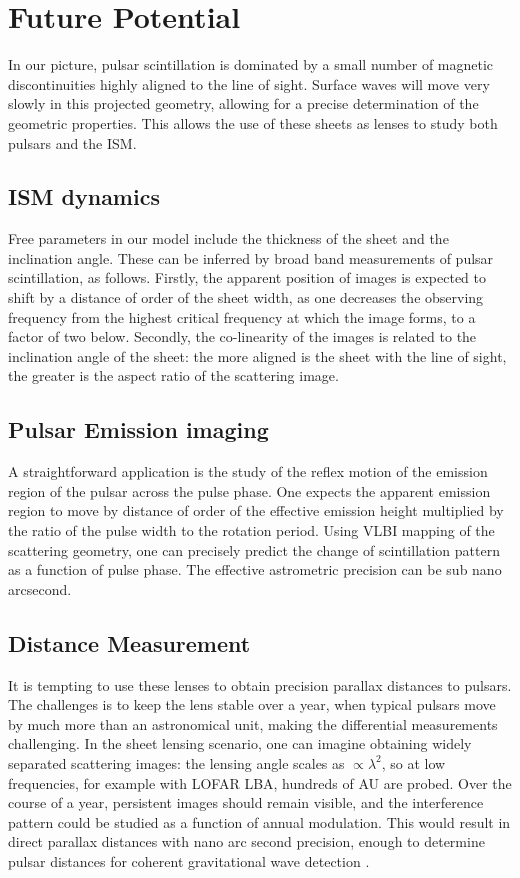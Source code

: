 \documentclass[useAMS,usenatbib]{mn2e}
\begin{document}
\section{Future Potential}

In our picture, pulsar scintillation is dominated by a small number of
magnetic discontinuities highly aligned to the line of sight.  Surface
waves will move very slowly in this projected geometry, allowing for a
precise determination of the geometric properties.  This allows the
use of these sheets as lenses to study both pulsars and the ISM.  

\subsection{ISM dynamics}

Free parameters in our model include the thickness of the sheet and the
inclination angle.  These can be inferred by broad band measurements
of pulsar scintillation, as follows. Firstly, the apparent position of images is expected to shift by
a distance of order of the sheet width, as one decreases the observing frequency from the
highest critical frequency at which the image forms, to a factor of
two below.  Secondly, the co-linearity of the images is related to
the inclination angle of the sheet: the more aligned is the sheet with the line of
sight, the greater is the aspect ratio of the scattering image.

\subsection{Pulsar Emission imaging}

A straightforward application is the study of the reflex motion of the
emission region of the pulsar across the pulse phase.  One expects the
apparent emission region to move by distance of order of the effective
emission height multiplied by the ratio of the pulse width to the
rotation period.  Using VLBI mapping of the scattering geometry, one
can precisely predict the change of scintillation pattern as a
function of pulse phase.  The effective astrometric precision can be
sub nano arcsecond.

\subsection{Distance Measurement}

It is tempting to use these lenses to obtain precision parallax
distances to pulsars.  
The challenges is to keep the lens stable over a year, when
typical pulsars move by much more than an astronomical unit, making
the differential measurements challenging.  In the sheet lensing
scenario, one can imagine obtaining widely separated scattering images:
the lensing angle scales as $\propto \lambda^2$, so at low
frequencies, for example with LOFAR LBA, hundreds of AU are probed.
Over the course of a year, persistent images should remain visible, and the
interference pattern could be studied as a function of annual
modulation.  This would result in direct parallax distances with nano arc
second precision, enough to determine pulsar distances for coherent
gravitational wave detection \citep{2010arXiv1010.4337B}.
\end{document}
